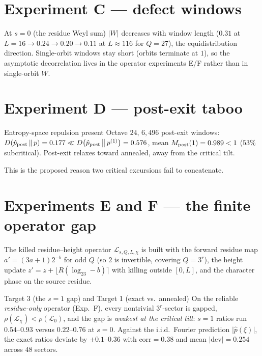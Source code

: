 \documentclass[11pt]{article}
\newcommand{\Lcal}{\mathcal{L}}
\newcommand{\KL}[2]{D\!\left(#1\,\middle\|\,#2\right)}
\theoremstyle{plain}
\theoremstyle{remark}
\begin{document}
\section{Experiment C --- defect windows}

At $s=0$ (the residue Weyl sum) $\lvert W\rvert$ decreases with window length
($0.31$ at $L{=}16\to0.24\to0.20\to0.11$ at $L{\approx}116$ for $Q=27$), the
equidistribution direction. Single-orbit windows stay short (orbits terminate at
$1$), so the asymptotic decorrelation lives in the operator experiments E/F rather
than in single-orbit $W$.

\section{Experiment D --- post-exit taboo}

\begin{findingbox}{Entropy-space repulsion present}
Octave $24$, $6{,}496$ post-exit windows: $\KL{\hat p_{\rm post}}{p}=0.177\ll
\KL{\hat p_{\rm post}}{p^{(1)}}=0.576$, mean $M_{\rm post}(1)=0.989<1$ ($53\%$
subcritical). Post-exit relaxes toward annealed, away from the critical tilt.
\end{findingbox}
\noindent This is the proposed reason two critical excursions fail to concatenate.

\section{Experiments E and F --- the finite operator gap}

The killed residue--height operator $\Lcal_{s,Q,L,\chi}$ is built with the forward
residue map $a'=(3a+1)2^{-b}$ for odd $Q$ (so $2$ is invertible, covering
$Q=3^r$), the height update $z'=z+\lfloor R(\log_23-b)\rceil$ with killing outside
$[0,L]$, and the character phase on the source residue.

\begin{findingbox}{Target 3 (the $s=1$ gap) and Target 1 (exact vs.\ annealed)}
On the reliable \emph{residue-only} operator (Exp.~F), every nontrivial
$3^r$-sector is gapped, $\rho(\Lcal_\chi)<\rho(\Lcal_0)$, and the gap is
\emph{weakest at the critical tilt}: $s{=}1$ ratios run $0.54$--$0.93$ versus
$0.22$--$0.76$ at $s{=}0$. Against the i.i.d.\ Fourier prediction
$\lvert\hat p(\xi)\rvert$, the exact ratios deviate by $\pm0.1$--$0.36$ with
$\mathrm{corr}=\mathbf{0.38}$ and mean $\lvert\text{dev}\rvert=0.254$ across $48$
sectors.
\end{findingbox}
\end{document}
